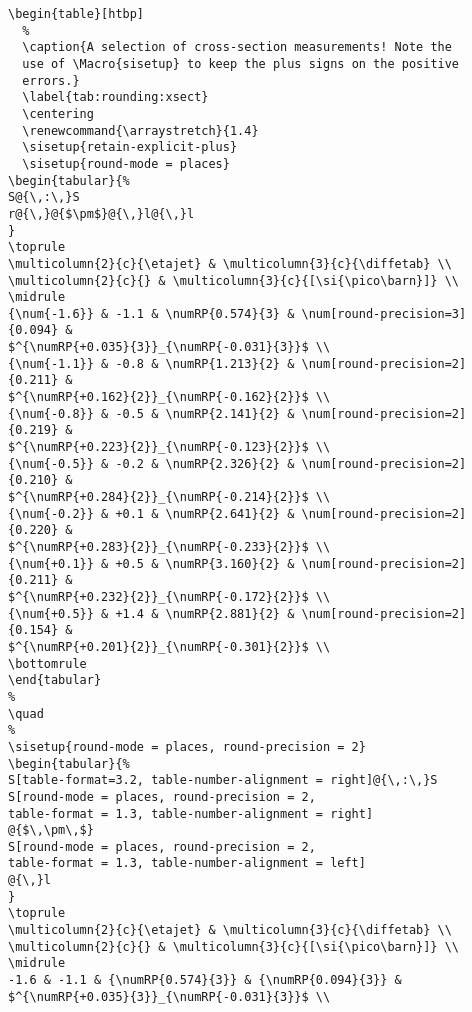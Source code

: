 \documentclass[UKenglish,texlive=2016]{\ATLASLATEXPATH atlasdoc}
\begin{document}
\begin{verbatim}
\begin{table}[htbp]
  %
  \caption{A selection of cross-section measurements! Note the
  use of \Macro{sisetup} to keep the plus signs on the positive
  errors.}
  \label{tab:rounding:xsect}
  \centering
  \renewcommand{\arraystretch}{1.4}
  \sisetup{retain-explicit-plus}
  \sisetup{round-mode = places}
\begin{tabular}{%
S@{\,:\,}S
r@{\,}@{$\pm$}@{\,}l@{\,}l
}
\toprule
\multicolumn{2}{c}{\etajet} & \multicolumn{3}{c}{\diffetab} \\
\multicolumn{2}{c}{} & \multicolumn{3}{c}{[\si{\pico\barn}]} \\
\midrule
{\num{-1.6}} & -1.1 & \numRP{0.574}{3} & \num[round-precision=3]{0.094} &
$^{\numRP{+0.035}{3}}_{\numRP{-0.031}{3}}$ \\
{\num{-1.1}} & -0.8 & \numRP{1.213}{2} & \num[round-precision=2]{0.211} &
$^{\numRP{+0.162}{2}}_{\numRP{-0.162}{2}}$ \\
{\num{-0.8}} & -0.5 & \numRP{2.141}{2} & \num[round-precision=2]{0.219} &
$^{\numRP{+0.223}{2}}_{\numRP{-0.123}{2}}$ \\
{\num{-0.5}} & -0.2 & \numRP{2.326}{2} & \num[round-precision=2]{0.210} &
$^{\numRP{+0.284}{2}}_{\numRP{-0.214}{2}}$ \\
{\num{-0.2}} & +0.1 & \numRP{2.641}{2} & \num[round-precision=2]{0.220} &
$^{\numRP{+0.283}{2}}_{\numRP{-0.233}{2}}$ \\
{\num{+0.1}} & +0.5 & \numRP{3.160}{2} & \num[round-precision=2]{0.211} &
$^{\numRP{+0.232}{2}}_{\numRP{-0.172}{2}}$ \\
{\num{+0.5}} & +1.4 & \numRP{2.881}{2} & \num[round-precision=2]{0.154} &
$^{\numRP{+0.201}{2}}_{\numRP{-0.301}{2}}$ \\
\bottomrule
\end{tabular}
%
\quad
%
\sisetup{round-mode = places, round-precision = 2}
\begin{tabular}{%
S[table-format=3.2, table-number-alignment = right]@{\,:\,}S
S[round-mode = places, round-precision = 2,
table-format = 1.3, table-number-alignment = right]
@{$\,\pm\,$}
S[round-mode = places, round-precision = 2,
table-format = 1.3, table-number-alignment = left]
@{\,}l
}
\toprule
\multicolumn{2}{c}{\etajet} & \multicolumn{3}{c}{\diffetab} \\
\multicolumn{2}{c}{} & \multicolumn{3}{c}{[\si{\pico\barn}]} \\
\midrule
-1.6 & -1.1 & {\numRP{0.574}{3}} & {\numRP{0.094}{3}} &
$^{\numRP{+0.035}{3}}_{\numRP{-0.031}{3}}$ \\

\end{verbatim}
\end{document}
